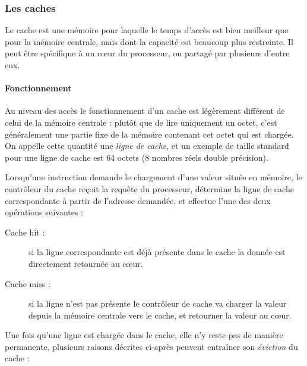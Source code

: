 \subsubsection{Les caches}
Le cache est une mémoire pour laquelle le temps d'accès est bien meilleur que pour la mémoire centrale, mais dont la capacité est beaucoup plus restreinte. Il peut être spécifique à un cœur du processeur, ou partagé par plusieurs d'entre eux.

\paragraph{Fonctionnement}

Au niveau des accès le fonctionnement d'un cache est légèrement différent de celui de la mémoire centrale : plutôt que de lire uniquement un octet, c'est généralement une partie fixe de la mémoire contenant cet octet qui est chargée.
On appelle cette quantité une \emph{ligne de cache}, et un exemple de taille standard pour une ligne de cache est 64 octets (8 nombres réels double précision).

Lorsqu'une instruction demande le chargement d'une valeur située en mémoire, le contrôleur du cache reçoit la requête du processeur, détermine la ligne de cache correspondante à partir de l'adresse demandée, et effectue l'une des deux opérations suivantes :
\begin{description}
  \item [Cache hit :] si la ligne correspondante est déjà présente dans le cache la donnée est directement retournée au cœur.
  \item [Cache miss :] si la ligne n'est pas présente le contrôleur de cache va charger la valeur depuis la mémoire centrale vers le cache, et retourner la valeur au cœur.
\end{description}

Une fois qu'une ligne est chargée dans le cache, elle n'y reste pas de manière permanente, plusieurs raisons décrites ci-après peuvent entraîner son \emph{éviction} du cache :

